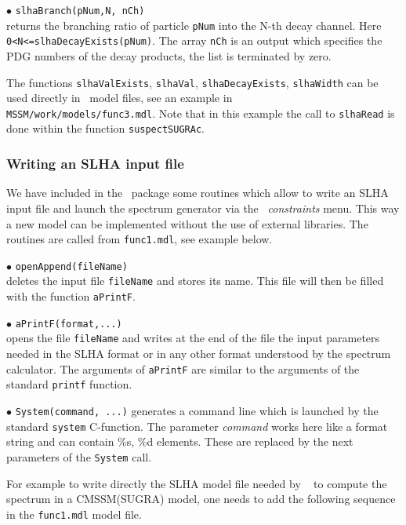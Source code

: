 \documentclass[12pt,a4paper]{article}
\begin{document}
\noindent
$\bullet$ \verb|slhaBranch(pNum,N, nCh)|\\
returns the  branching ratio of  particle \verb|pNum| into the N-th decay channel. Here\\
\noindent \verb|0<N<=slhaDecayExists(pNum)|.
The array \verb|nCh| is an output which specifies the  PDG numbers of the decay products, the list  
is terminated by zero.

The functions \verb|slhaValExists|, \verb|slhaVal|, 
\verb|slhaDecayExists|, \verb|slhaWidth| can be used directly 
in \calchep\ model files, see an example in \\
\verb|MSSM/work/models/func3.mdl|. Note that in this example the 
call to \verb|slhaRead| is done within the function \verb|suspectSUGRAc|.


\subsubsection{Writing an SLHA input file}
We have included in the \micro\ package some routines which allow to write
an SLHA input file and launch the spectrum generator via the \calchep\ 
{\it constraints} menu.  This way a new model can be implemented without the use of
external libraries. The routines are called from \verb|func1.mdl|, see example below.

\noindent
$\bullet$ \verb|openAppend(fileName)|\\
deletes the input file \verb|fileName| and stores its name. This file will then be filled with
the function \verb|aPrintF|.

\noindent
$\bullet$ \verb|aPrintF(format,...)|\\
opens the file \verb|fileName| and writes at the end of the file the input parameters needed in the SLHA format or in any other format
understood by the spectrum calculator.  The arguments of 
\verb|aPrintF| are similar to the arguments of the standard \verb|printf| function.

\noindent
$\bullet$ \verb|System(command, ...)|  
generates a command line which is launched by the standard \verb|system|
C-function. The parameter {\it command} works here like a format string and can contain \%s, \%d elements. 
These are replaced by the next parameters  of the \verb|System|  call.

For example to write directly the SLHA model file needed by \suspect~ to compute 
the spectrum in a CMSSM(SUGRA) model, one needs to add the following sequence in the \verb|func1.mdl| model file.
\end{document}
